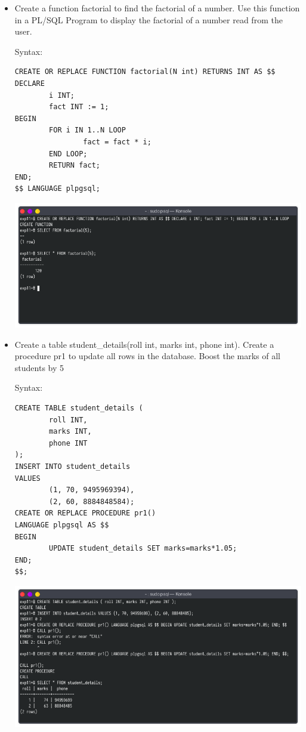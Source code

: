 \documentclass[13pt,oneside]{book}
\begin{document}
\begin{itemize}
	\item
Create a function factorial to find the factorial of a number. Use this function in a
 PL/SQL Program to display the factorial of a number read from the user.
 
Syntax:
\begin{verbatim}
CREATE OR REPLACE FUNCTION factorial(N int) RETURNS INT AS $$
DECLARE
        i INT;
        fact INT := 1;
BEGIN
        FOR i IN 1..N LOOP
                fact = fact * i;
        END LOOP;
        RETURN fact;
END;
$$ LANGUAGE plpgsql;

\end{verbatim}
\includegraphics[width=\textwidth]{img/p12/ss1.png}


\item
Create a table student\_details(roll int, marks int, phone int). Create a procedure pr1
 to update all rows in the database. Boost the marks of all students by 5%
 
Syntax:
\begin{verbatim}
CREATE TABLE student_details (
        roll INT,
        marks INT,
        phone INT
);
INSERT INTO student_details 
VALUES
        (1, 70, 9495969394),
        (2, 60, 8884848584);
CREATE OR REPLACE PROCEDURE pr1()
LANGUAGE plpgsql AS $$
BEGIN
        UPDATE student_details SET marks=marks*1.05;
END;
$$;

\end{verbatim}
\includegraphics[width=\textwidth]{img/p12/ss2.png}



\end{itemize}
\end{document}
